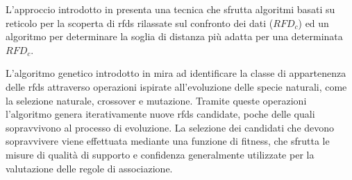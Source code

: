 L'approccio introdotto in \cite{rfddiscovery} presenta una tecnica che sfrutta algoritmi basati su reticolo per la scoperta di \acrshort{rfds} rilassate sul confronto dei dati ($RFD_c$) ed un algoritmo per determinare la soglia di distanza pi\`{u} adatta per una determinata $RFD_c$.\par
L'algoritmo genetico introdotto in \cite{evominingrd} mira ad identificare la classe di appartenenza delle \acrshort{rfds} attraverso operazioni ispirate all'evoluzione delle specie naturali, come la selezione naturale, crossover e mutazione. Tramite queste operazioni l'algoritmo genera iterativamente nuove \acrshort{rfds} candidate, poche delle quali sopravvivono al processo di evoluzione. La selezione dei candidati che devono sopravvivere viene effettuata mediante una funzione di fitness, che sfrutta le misure di qualit\`{a} di supporto e confidenza generalmente utilizzate per la valutazione delle regole di associazione.